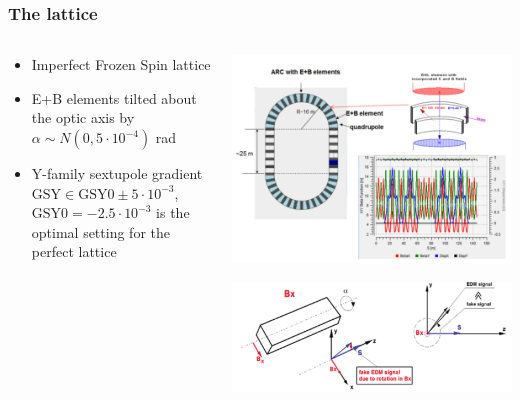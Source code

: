 \documentclass{beamer}
\begin{document}
\begin{frame}\frametitle{The lattice}
  \begin{columns}
    \begin{column}{.5\textwidth}
      \begin{itemize}
      \item Imperfect Frozen Spin lattice
      \item E+B elements tilted about the optic axis by $\alpha\sim N(0, 5\cdot 10^{-4})$ rad
      \item Y-family sextupole gradient $\mathrm{GSY}\in \mathrm{GSY0} \pm 5\cdot 10^{-3}$, $\mathrm{GSY0}=-2.5\cdot10^{-3}$ is the optimal setting for the perfect lattice
      \end{itemize}
    \end{column}
    \begin{column}{.5\textwidth}
      \begin{center}
        \includegraphics[width=\linewidth]{../img/Lattice/BNL}
        
        \includegraphics[width=\linewidth]{../img/Lattice/magnet_tilting}
      \end{center}
    \end{column}
  \end{columns}
\end{frame}
\end{document}
